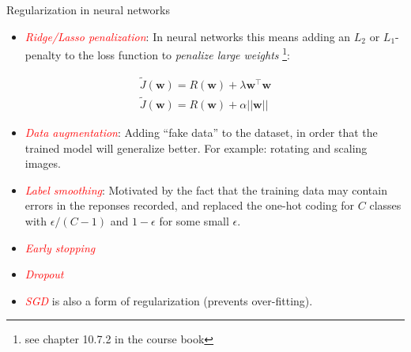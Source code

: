 \documentclass[
  10pt,
  ignorenonframetext,
]{beamer}
\providecommand{\tightlist}{%
  \setlength{\itemsep}{0pt}\setlength{\parskip}{0pt}}
\begin{document}
\begin{frame}
\begin{block}{Regularization in neural networks}
\protect\hypertarget{regularization-in-neural-networks}{}
\(~\)

\begin{itemize}
\tightlist
\item
  \emph{\textcolor{red}{Ridge/Lasso penalization}}: In neural networks
  this means adding an \(L_2\) or \(L_1\)-penalty to the loss function
  to \emph{penalize large weights}
  \footnote{see chapter 10.7.2 in the course book}:
\end{itemize}

\begin{align*} \tilde{J}({\boldsymbol w})= R({\boldsymbol w}) + \lambda{{\boldsymbol w}^\top{\boldsymbol w}}  \\
 \tilde{J}({\boldsymbol w})= R({\boldsymbol w}) + \alpha ||{\boldsymbol w}||
\end{align*}

\vspace{2mm}

\begin{itemize}
\tightlist
\item
  \emph{\textcolor{red}{Data augmentation}}: Adding ``fake data'' to the
  dataset, in order that the trained model will generalize better. For
  example: rotating and scaling images.
\end{itemize}

\vspace{2mm}

\begin{itemize}
\tightlist
\item
  \emph{\textcolor{red}{Label smoothing}}: Motivated by the fact that
  the training data may contain errors in the reponses recorded, and
  replaced the one-hot coding for \(C\) classes with \(\epsilon/(C-1)\)
  and \(1-\epsilon\) for some small \(\epsilon\).
\end{itemize}

\vspace{2mm}

\begin{itemize}
\tightlist
\item
  \emph{\textcolor{red}{Early stopping}}
\end{itemize}

\vspace{2mm}

\begin{itemize}
\tightlist
\item
  \emph{\textcolor{red}{Dropout}}
\end{itemize}

\vspace{2mm}

\begin{itemize}
\tightlist
\item
  \emph{\textcolor{red}{SGD}} is also a form of regularization (prevents
  over-fitting).
\end{itemize}
\end{block}
\end{frame}
\end{document}
